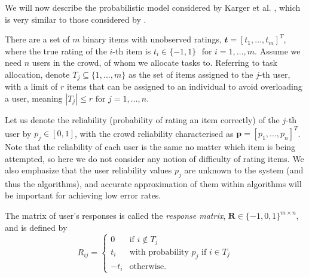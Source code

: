 \documentclass[12pt]{article}
\numberwithin{equation}{section}
\newcommand*\abs[1]{\left\vert#1\right\vert}
\begin{document}
We will now describe the probabilistic model considered by Karger et al. \cite{KOS13}, which is very similar to those considered by \cite{GKM11,DDK+13}.

There are a set of $m$ binary items with unobserved ratings, $\mathbfit{t} = [t_{1},\dots,t_{m}]^{T}$, where the true rating of the $i$-th item is $t_{i} \in \{-1,1\}$ $\text{ for } i=1,\dots,m$. Assume we need $n$ users in the crowd, of whom we allocate tasks to. Referring to task allocation, denote $T_{j} \subseteq \{1,\dots,m\}$ as the set of items assigned to the $j$-th user, with a limit of $r$ items that can be assigned to an individual to avoid overloading a user, meaning $\abs{T_{j}} \le r \text{ for } j=1,\dots,n$.

Let us denote the reliability (probability of rating an item correctly) of the $j$-th user by $p_{j} \in [0,1]$, with the crowd reliability characterised as $\mathbf{p} = [p_{1},\dots,p_{n}]^{T}$. Note that the reliability of each user is the same no matter which item is being attempted, so here we do not consider any notion of difficulty of rating items. We also emphasize that the user reliability values $p_{j}$ are unknown to the system (and thus the algorithms), and accurate approximation of them within algorithms will be important for achieving low error rates.

The matrix of user's responses is called the \textit{response matrix}, $\mathbf{R} \in \{-1,0,1\}^{m \times n}$, and is defined by
\begin{equation}
	R_{ij} =
	\begin{cases}
		0 & \text{if } i \not \in T_{j}\\
		t_{i} & \text{with probability }  p_{j} \text{ if } i \in T_{j}\\
		-t_{i} & \text{otherwise}.
	\end{cases}
\end{equation}
\end{document}
